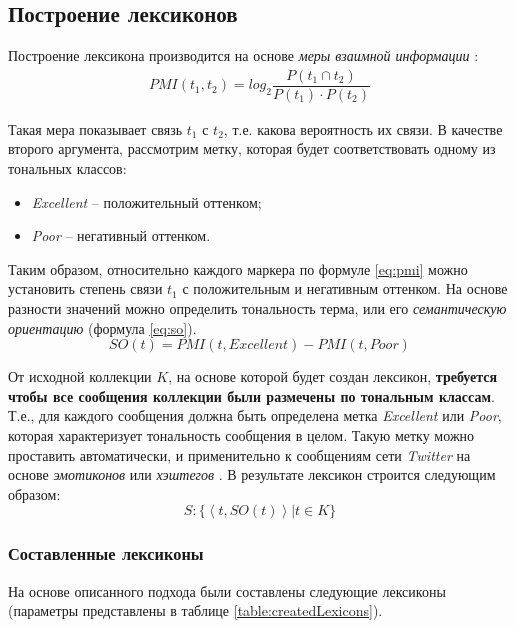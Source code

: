 \subsection{Построение лексиконов}

Построение лексикона производится на основе {\it меры взаимной информации}
\cite{lexiconSO}:
\begin{gather}
    PMI(t_1, t_2) = log_2 \dfrac{P(t_1\cap t_2)}{P(t_1)\cdot P(t_2)}
    \label{eq:pmi}
\end{gather}

Такая мера показывает связь $t_1$ с $t_2$, т.е. какова вероятность их связи.
В качестве второго аргумента, рассмотрим метку, которая будет соответствовать
одному из тональных классов:
\begin{itemize}
    \item {\it Excellent} -- положительный оттенком;
    \item {\it Poor} -- негативный оттенком.
\end{itemize}

Таким образом, относительно каждого маркера по формуле \ref{eq:pmi} можно
установить степень связи $t_1$ с положительным и негативным оттенком.
На основе разности значений можно определить тональность терма, или его
{\it семантическую ориентацию} (формула \ref{eq:so}).
\begin{equation}
    \label{eq:so}
    SO(t) = PMI(t, Excellent) - PMI(t, Poor)
\end{equation}

От исходной коллекции $K$, на основе которой будет создан лексикон, {\bf требуется
чтобы все сообщения коллекции были размечены по тональным классам}.
Т.е., для каждого сообщения должна быть определена метка {\it Excellent} или
{\it Poor}, которая характеризует тональность сообщения в целом.
Такую метку можно проставить автоматически, и применительно к сообщениям
сети {\it Twitter} на основе {\it эмотиконов} или {\it хэштегов} \cite{severyn}.
В результате лексикон строится следующим образом:
\begin{equation}
    S : \{ \left< t, SO(t) \right> | t \in K\}
\end{equation}

\subsubsection{Составленные лексиконы}
На основе описанного подхода были составлены следующие лексиконы
(параметры представлены в таблице \ref{table:createdLexicons}).


